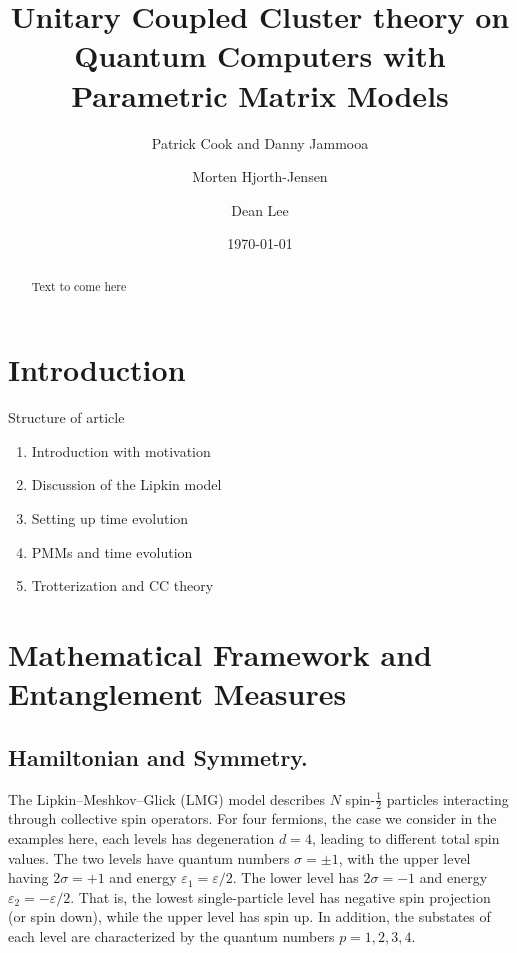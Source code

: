 \documentclass[twocolumn,superscriptaddress,unsortedaddress,nofootinbib,amsmath,amssymb,
aps,floatfix]{revtex4-2}
\begin{document}
\title{Unitary Coupled Cluster theory on Quantum Computers with Parametric Matrix Models}
\author{Patrick Cook and Danny Jammooa}
\author{Morten Hjorth-Jensen}
\author{Dean Lee}
\begin{abstract}
Text to come here
\end{abstract}



\date{\today}

\maketitle

\section{Introduction} 
Structure of article
\begin{enumerate}
    \item Introduction with motivation
    \item Discussion of the Lipkin model
    \item Setting up time evolution
    \item PMMs and time evolution
    \item Trotterization and CC theory
\end{enumerate}

\section{Mathematical Framework and Entanglement Measures}

\subsection{Hamiltonian and Symmetry.}
The Lipkin--Meshkov--Glick (LMG) model describes $N$ spin-$\tfrac{1}{2}$ particles interacting through collective spin operators.  
For four fermions, the case we consider in the examples  here, each levels has
degeneration $d=4$, leading to different total spin values.  The two
levels have quantum numbers $\sigma=\pm 1$, with the upper level
having $2\sigma=+1$ and energy $\varepsilon_{1}= \varepsilon/2$. The
lower level has $2\sigma=-1$ and energy
$\varepsilon_{2}=-\varepsilon/2$. That is, the lowest single-particle
level has negative spin projection (or spin down), while the upper
level has spin up.  In addition, the substates of each level are
characterized by the quantum numbers $p=1,2,3,4$.
\end{document}
